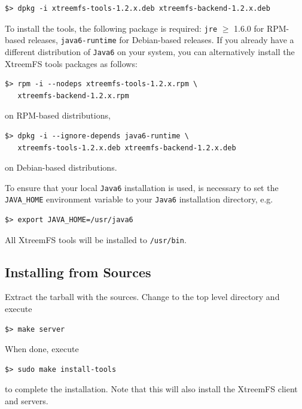 \documentclass[a4paper,10pt]{book}
\begin{document}
\begin{verbatim}
$> dpkg -i xtreemfs-tools-1.2.x.deb xtreemfs-backend-1.2.x.deb
\end{verbatim}

To install the tools, the following package is required: \texttt{jre} $\geq$ 1.6.0 for RPM-based releases, \texttt{java6-runtime} for Debian-based releases. If you already have a different distribution of \texttt{Java6} on your system, you can alternatively install the XtreemFS tools packages as follows:

\begin{verbatim}
$> rpm -i --nodeps xtreemfs-tools-1.2.x.rpm \
   xtreemfs-backend-1.2.x.rpm
\end{verbatim}

on RPM-based distributions,

\begin{verbatim}
$> dpkg -i --ignore-depends java6-runtime \
   xtreemfs-tools-1.2.x.deb xtreemfs-backend-1.2.x.deb
\end{verbatim}

on Debian-based distributions.

To ensure that your local \texttt{Java6} installation is used, is necessary to set the \texttt{JAVA\_HOME} environment variable to your \texttt{Java6} installation directory, e.g.\

\begin{verbatim}
$> export JAVA_HOME=/usr/java6
\end{verbatim}


All XtreemFS tools will be installed to \texttt{/usr/bin}.

\subsection{Installing from Sources}

Extract the tarball with the sources. Change to the top level directory and execute

\begin{verbatim}
$> make server
\end{verbatim}

When done, execute

\begin{verbatim}
$> sudo make install-tools
\end{verbatim}

to complete the installation. Note that this will also install the XtreemFS client and servers.
\end{document}
